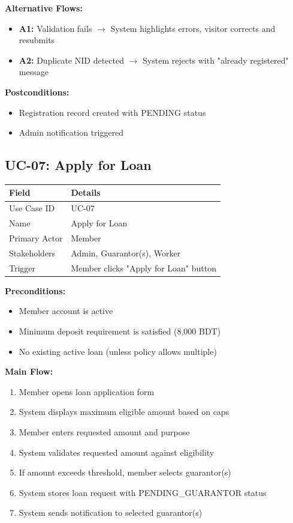 \documentclass[11pt,a4paper]{article}
\begin{document}
\textbf{Alternative Flows:}
\begin{itemize}
    \item \textbf{A1:} Validation fails $\rightarrow$ System highlights errors, visitor corrects and resubmits
    \item \textbf{A2:} Duplicate NID detected $\rightarrow$ System rejects with "already registered" message
\end{itemize}

\textbf{Postconditions:}
\begin{itemize}
    \item Registration record created with PENDING status
    \item Admin notification triggered
\end{itemize}

\subsection{UC-07: Apply for Loan}

\begin{tabular}{@{}p{3.5cm}p{9.5cm}@{}}
\toprule
\textbf{Field} & \textbf{Details} \\
\midrule
Use Case ID & UC-07 \\
Name & Apply for Loan \\
Primary Actor & Member \\
Stakeholders & Admin, Guarantor(s), Worker \\
Trigger & Member clicks "Apply for Loan" button \\
\bottomrule
\end{tabular}

\vspace{0.5em}
\textbf{Preconditions:}
\begin{itemize}
    \item Member account is active
    \item Minimum deposit requirement is satisfied (8,000 BDT)
    \item No existing active loan (unless policy allows multiple)
\end{itemize}

\textbf{Main Flow:}
\begin{enumerate}
    \item Member opens loan application form
    \item System displays maximum eligible amount based on caps
    \item Member enters requested amount and purpose
    \item System validates requested amount against eligibility
    \item If amount exceeds threshold, member selects guarantor(s)
    \item System stores loan request with PENDING\_GUARANTOR status
    \item System sends notification to selected guarantor(s)
\end{enumerate}
\end{document}
